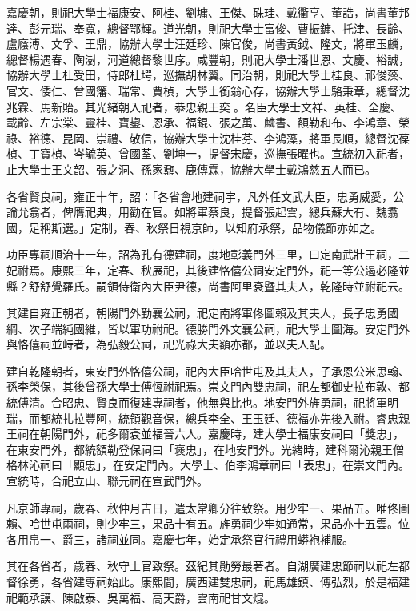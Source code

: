 \begin{pinyinscope}
嘉慶朝，則祀大學士福康安、阿桂、劉墉、王傑、硃珪、戴衢亨、董誥，尚書董邦達、彭元瑞、奉寬，總督鄂輝。道光朝，則祀大學士富俊、曹振鏞、托津、長齡、盧廕溥、文孚、王鼎，協辦大學士汪廷珍、陳官俊，尚書黃鉞、隆文，將軍玉麟，總督楊遇春、陶澍，河道總督黎世序。咸豐朝，則祀大學士潘世恩、文慶、裕誠，協辦大學士杜受田，侍郎杜堮，巡撫胡林翼。同治朝，則祀大學士桂良、祁俊藻、官文、倭仁、曾國籓、瑞常、賈楨，大學士銜翁心存，協辦大學士駱秉章，總督沈兆霖、馬新貽。其光緒朝入祀者，恭忠親王奕。名臣大學士文祥、英桂、全慶、載齡、左宗棠、靈桂、寶鋆、恩承、福錕、張之萬、麟書、額勒和布、李鴻章、榮祿、裕德、昆岡、崇禮、敬信，協辦大學士沈桂芬、李鴻藻，將軍長順，總督沈葆楨、丁寶楨、岑毓英、曾國荃、劉坤一，提督宋慶，巡撫張曜也。宣統初入祀者，止大學士王文韶、張之洞、孫家鼐、鹿傳霖，協辦大學士戴鴻慈五人而已。

各省賢良祠，雍正十年，詔：「各省會地建祠宇，凡外任文武大臣，忠勇威愛，公論允翕者，俾膺祀典，用勸在官。如將軍蔡良，提督張起雲，總兵蘇大有、魏翥國，足稱斯選。」定制，春、秋祭日視京師，以知府承祭，品物儀節亦如之。

功臣專祠順治十一年，詔為孔有德建祠，度地彰義門外三里，曰定南武壯王祠，二妃祔焉。康熙三年，定春、秋展祀，其後建恪僖公祠安定門外，祀一等公遏必隆並縣？舒舒覺羅氏。嗣領侍衛內大臣尹德，尚書阿里袞暨其夫人，乾隆時並祔祀云。

其建自雍正朝者，朝陽門外勤襄公祠，祀定南將軍佟圖賴及其夫人，長子忠勇國綱、次子端純國維，皆以軍功祔祀。德勝門外文襄公祠，祀大學士圖海。安定門外與恪僖祠並峙者，為弘毅公祠，祀光祿大夫額亦都，並以夫人配。

建自乾隆朝者，東安門外恪僖公祠，祀內大臣哈世屯及其夫人，子承恩公米思翰、孫李榮保，其後曾孫大學士傅恆祔祀焉。崇文門內雙忠祠，祀左都御史拉布敦、都統傅清。合昭忠、賢良而復建專祠者，他無與比也。地安門外旌勇祠，祀將軍明瑞，而都統扎拉豐阿，統領觀音保，總兵李全、王玉廷、德福亦先後入祔。睿忠親王祠在朝陽門外，祀多爾袞並福晉六人。嘉慶時，建大學士福康安祠曰「獎忠」，在東安門外，都統額勒登保祠曰「褒忠」，在地安門外。光緒時，建科爾沁親王僧格林沁祠曰「顯忠」，在安定門內。大學士、伯李鴻章祠曰「表忠」，在崇文門內。宣統時，合祀立山、聯元祠在宣武門外。

凡京師專祠，歲春、秋仲月吉日，遣太常卿分往致祭。用少牢一、果品五。唯佟圖賴、哈世屯兩祠，則少牢三，果品十有五。旌勇祠少牢如通常，果品亦十五雲。位各用帛一、爵三，諸祠並同。嘉慶七年，始定承祭官行禮用蟒袍補服。

其在各省者，歲春、秋守土官致祭。茲紀其勛勞最著者。自湖廣建忠節祠以祀左都督徐勇，各省建專祠始此。康熙間，廣西建雙忠祠，祀馬雄鎮、傅弘烈，於是福建祀範承謨、陳啟泰、吳萬福、高天爵，雲南祀甘文焜。


\end{pinyinscope}
